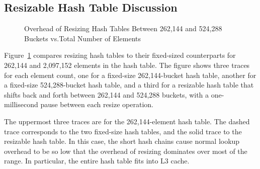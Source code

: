 \QuickQuizEnd

\subsection{Resizable Hash Table Discussion}
\label{sec:datastruct:Resizable Hash Table Discussion}

\begin{figure}
\centering
{}
\caption{Overhead of Resizing Hash Tables Between 262,144 and 524,288 Buckets vs.\@ Total Number of Elements}
\label{fig:datastruct:Overhead of Resizing Hash Tables Between 262;144 and 524;288 Buckets vs. Total Number of Elements}
\end{figure}

Figure~\ref{fig:datastruct:Overhead of Resizing Hash Tables Between 262;144 and 524;288 Buckets vs. Total Number of Elements}
compares resizing hash tables to their fixed-sized counterparts
for 262,144 and 2,097,152 elements in the hash table.
The figure shows three traces for each element count, one
for a fixed-size 262,144-bucket hash table, another for a
fixed-size 524,288-bucket hash table, and a third for a resizable
hash table that shifts back and forth between 262,144 and 524,288
buckets, with a one-millisecond pause between each resize operation.

The uppermost three traces are for the 262,144-element hash table.
The dashed trace corresponds to the two fixed-size hash tables,
and the solid trace to the resizable hash table.
In this case, the short hash chains cause normal lookup overhead
to be so low that the overhead of resizing dominates over most
of the range.
In particular, the entire hash table fits into L3 cache.


